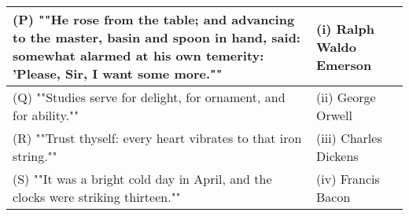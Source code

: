 \begin{tabular}{|p{3in}|p{1.5in}|}
\hline
(P) ""He rose from the table; and advancing to the master, basin and spoon in hand, said: somewhat alarmed at his own temerity: 'Please, Sir, I want some more."" & (i) Ralph Waldo Emerson \\
\hline
(Q) ""Studies serve for delight, for ornament, and for ability."" & (ii) George Orwell \\
\hline
(R) ""Trust thyself: every heart vibrates to that iron string."" & (iii) Charles Dickens \\
\hline
(S) ""It was a bright cold day in April, and the clocks were striking thirteen."" & (iv) Francis Bacon \\
\hline
\end{tabular}
